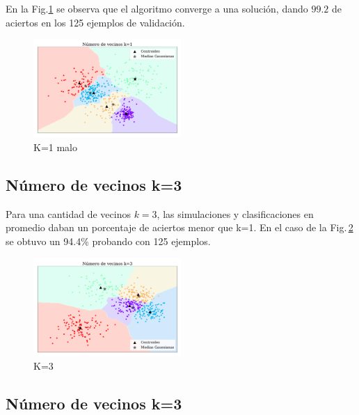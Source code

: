     En la Fig.\ref{fig:ejer4_k_1} se observa que el algoritmo converge a una solución, dando $99.2$ de aciertos en los 125 ejemplos de validación.


\begin{figure}[H]
    \centering
    \includegraphics[width=0.5\textwidth]{plots/ejer_4_K-1_si_converge.pdf}
    \caption{K=1 malo}
    \label{fig:ejer4_k_1}
\end{figure} 

    \subsection*{Número de vecinos k=3}

    Para una cantidad de vecinos $k=3$, las  simulaciones y clasificaciones en promedio daban un porcentaje de aciertos menor que k=1. En el caso de la Fig.\,\ref{fig:ejer4_k_3} se obtuvo un 94.4\% probando con 125 ejemplos. 




\begin{figure}[H]
    \centering
    \includegraphics[width=0.5\textwidth]{plots/ejer_4_K-3_si_converge.pdf}
    \caption{K=3 }
    \label{fig:ejer4_k_3}
\end{figure} 

    \subsection*{Número de vecinos k=3}

